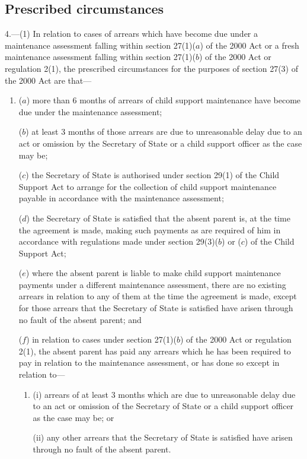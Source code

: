 \documentclass[12pt,a4paper]{article}
\begin{document}

\subsection[4. Prescribed circumstances]{Prescribed circumstances}

4.---(1)  In relation to cases of arrears which have become due under a maintenance assessment falling within section 27(1)($a$)  of the 2000 Act or a fresh maintenance assessment falling within section 27(1)($b$)  of the 2000 Act or regulation 2(1), the prescribed circumstances for the purposes of section 27(3) of the 2000 Act are that—
\begin{enumerate}\item[]
($a$) more than 6 months of arrears of child support maintenance have become due under the maintenance assessment;

($b$) at least 3 months of those arrears are due to unreasonable delay due to an act or omission by the Secretary of State or a child support officer as the case may be;

($c$) the Secretary of State is authorised under section 29(1) of the Child Support Act to arrange for the collection of child support maintenance payable in accordance with the maintenance assessment;

($d$) the Secretary of State is satisfied that the absent parent is, at the time the agreement is made, making such payments as are required of him in accordance with regulations made under section 29(3)($b$)  or ($c$)  of the Child Support Act;

($e$) where the absent parent is liable to make child support maintenance payments under a different maintenance assessment, there are no existing arrears in relation to any of them at the time the agreement is made, except for those arrears that the Secretary of State is satisfied have arisen through no fault of the absent parent; and

($f$) in relation to cases under section 27(1)($b$)  of the 2000 Act or regulation 2(1), the absent parent has paid any arrears which he has been required to pay in relation to the maintenance assessment, or has done so except in relation to—
\begin{enumerate}\item[]
(i) arrears of at least 3 months which are due to unreasonable delay due to an act or omission of the Secretary of State or a child support officer as the case may be; or

(ii) any other arrears that the Secretary of State is satisfied have arisen through no fault of the absent parent.
\end{enumerate}
\end{enumerate}
\end{document}
